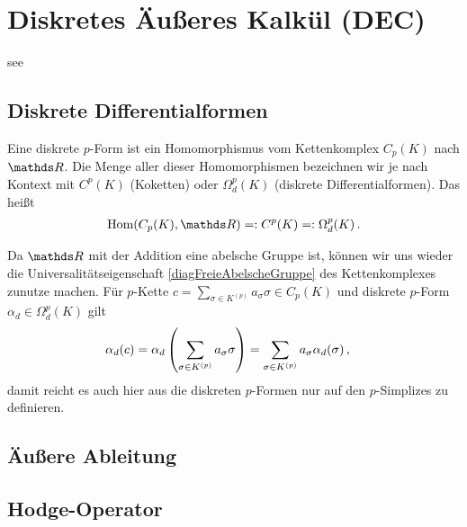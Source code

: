 \chapter{Diskretes Äußeres Kalkül (DEC)}
\label{chapterDEC}

see \cite{Lee} \cite{FirstCourse}

\section{Diskrete Differentialformen}
  
  \begin{definition}
    Eine diskrete \( p \)-Form ist ein Homomorphismus vom Kettenkomplex \( C_{p}(K) \) nach \( \R \).
    Die Menge aller dieser Homomorphismen bezeichnen wir je nach Kontext mit \( C^{p}(K) \) (Koketten)
    oder \( \Omega^{p}_{d}(K) \) (diskrete Differentialformen). 
    Das heißt
    \begin{align}
      \hom(C_{p}(K),\R) =: C^{p}(K) =: \Omega^{p}_{d}(K) \formpunkt
    \end{align}
  \end{definition}
  
  \begin{folgerung}
    Da \( \R \) mit der Addition eine abelsche Gruppe ist, können wir uns wieder die Universalitätseigenschaft \eqref{diagFreieAbelscheGruppe} des Kettenkomplexes zunutze machen.
    Für \( p \)-Kette \( c = \sum_{\sigma\in K^{(p)}} a_{\sigma} \sigma \in C_{p}(K)\) und diskrete \( p \)-Form \( \alpha_{d}\in\Omega^{p}_{d}(K) \) gilt
    \begin{align}
      \alpha_{d}(c) &= \alpha_{d}\left(\sum_{\sigma\in K^{(p)}} a_{\sigma} \sigma\right) = \sum_{\sigma\in K^{(p)}} a_{\sigma} \alpha_{d}(\sigma) \,\text{,}
    \end{align}
    damit reicht es auch hier aus die diskreten \( p \)-Formen nur auf den \( p \)-Simplizes zu definieren.
  \end{folgerung}


  
  

\section{Äußere Ableitung}
  

  

  

\section{Hodge-Operator}

